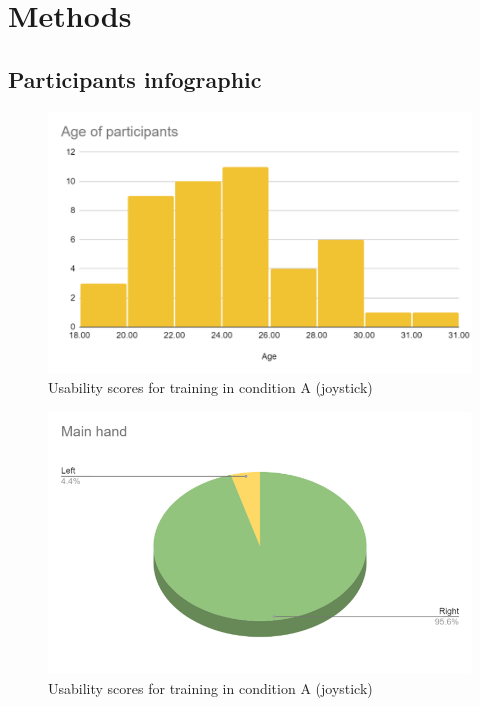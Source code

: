 \section{Methods}
\label{sec:appendix_A2}

\subsection{Participants infographic}
\label{sec:appendix_A2.1}

\begin{figure}[!htb]
\includegraphics[width=14cm]{img/appendix/age_distribution.png}
\centering
\caption{Usability scores for training in condition A (joystick)}\label{fig:usbility_condition_B}
\end{figure}

\begin{figure}[!htb]
\includegraphics[width=14cm]{img/appendix/right_hand.png}
\centering
\caption{Usability scores for training in condition A (joystick)}\label{fig:usbility_condition_B}
\end{figure}

